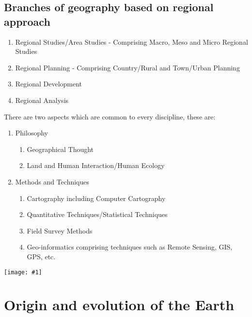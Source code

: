 \documentclass[8pt, a4paper, oneside, twocolumn]{extarticle}
\newcommand{\ph}[1]{
    \texttt{[image: \#1]}
}
\begin{document}
\subsection{Branches of geography based on regional approach}
\begin{enumerate}
\item Regional Studies/Area Studies - Comprising Macro, Meso and Micro Regional Studies
\item Regional Planning - Comprising Country/Rural and Town/Urban Planning
\item Regional Development
\item Regional Analysis
\end{enumerate}
There are two aspects which are common
to every discipline, these are:
\begin{enumerate}
\item Philosophy
  \begin{enumerate}
  \item Geographical Thought
  \item Land and Human Interaction/Human Ecology
  \end{enumerate}
\item Methods and Techniques
  \begin{enumerate}
  \item Cartography including Computer Cartography
  \item Quantitative Techniques/Statistical Techniques
  \item Field Survey Methods
  \item Geo-informatics comprising techniques such as Remote Sensing, GIS, GPS, etc.
  \end{enumerate}
\end{enumerate}
\ph{fieldgeo}

\section{Origin and evolution of the Earth}
\end{document}
